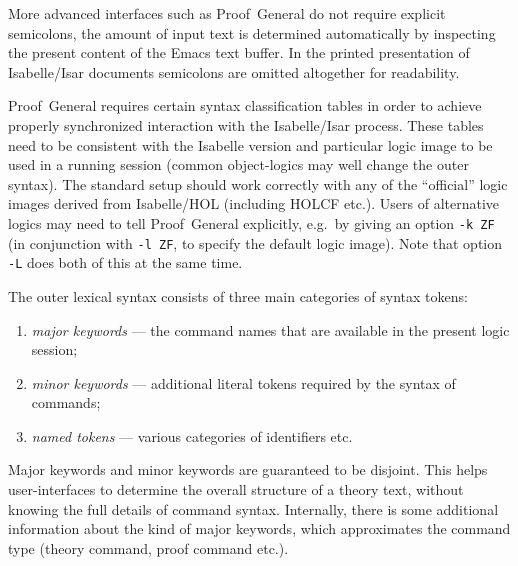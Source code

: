 \begin{isabellebody}
\begin{isamarkuptext}
  More advanced interfaces such as Proof~General \cite{proofgeneral}
  do not require explicit semicolons, the amount of input text is
  determined automatically by inspecting the present content of the
  Emacs text buffer.  In the printed presentation of Isabelle/Isar
  documents semicolons are omitted altogether for readability.

  \begin{warn}
    Proof~General requires certain syntax classification tables in
    order to achieve properly synchronized interaction with the
    Isabelle/Isar process.  These tables need to be consistent with
    the Isabelle version and particular logic image to be used in a
    running session (common object-logics may well change the outer
    syntax).  The standard setup should work correctly with any of the
    ``official'' logic images derived from Isabelle/HOL (including
    HOLCF etc.).  Users of alternative logics may need to tell
    Proof~General explicitly, e.g.\ by giving an option \verb|-k ZF|
    (in conjunction with \verb|-l ZF|, to specify the default
    logic image).  Note that option \verb|-L| does both
    of this at the same time.
  \end{warn}%
\end{isamarkuptext}%
\isamarkuptrue%
%
\isamarkuptrue%
%
\begin{isamarkuptext}%
The outer lexical syntax consists of three main categories of
  syntax tokens:

  \begin{enumerate}

  \item \emph{major keywords} --- the command names that are available
  in the present logic session;

  \item \emph{minor keywords} --- additional literal tokens required
  by the syntax of commands;

  \item \emph{named tokens} --- various categories of identifiers etc.

  \end{enumerate}

  Major keywords and minor keywords are guaranteed to be disjoint.
  This helps user-interfaces to determine the overall structure of a
  theory text, without knowing the full details of command syntax.
  Internally, there is some additional information about the kind of
  major keywords, which approximates the command type (theory command,
  proof command etc.).


\end{isamarkuptext}
\end{isabellebody}

